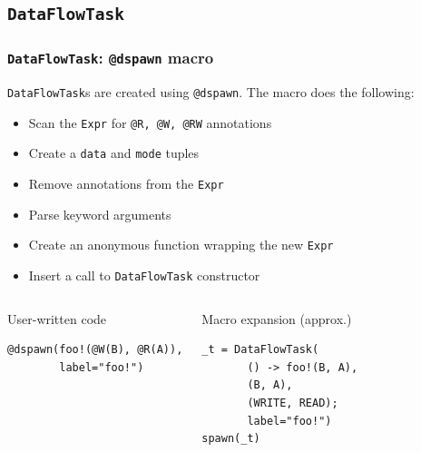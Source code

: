 \documentclass{beamer}
\begin{document}
\subsection{\texttt{DataFlowTask}}

\begin{frame}[fragile]

\frametitle{\texttt{DataFlowTask}: \texttt{@dspawn} macro}

\texttt{DataFlowTask}s are created using \texttt{@dspawn}. The macro
does the following:

\begin{itemize}
    \item Scan the \texttt{Expr} for \texttt{@R, @W, @RW} annotations
    \item Create a \texttt{data} and \texttt{mode}
    tuples
    \item Remove annotations from the \texttt{Expr}
    \item Parse keyword arguments    
    \item Create an anonymous function wrapping the new \texttt{Expr}
    \item Insert a call to \texttt{DataFlowTask} constructor
\end{itemize}

\begin{columns}

\begin{exampleblock}{User-written code}    
\begin{verbatim}
@dspawn(foo!(@W(B), @R(A)),
        label="foo!")
\end{verbatim}
\end{exampleblock}


\begin{exampleblock}{Macro expansion (approx.)}
\begin{verbatim}
_t = DataFlowTask(
       () -> foo!(B, A),
       (B, A),
       (WRITE, READ);
       label="foo!")
spawn(_t)
\end{verbatim}
\end{exampleblock}

\end{columns}
%

\end{frame} 
\end{document}
